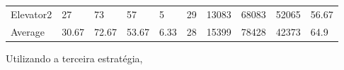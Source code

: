 \documentclass[a4paper]{article}
\begin{document}
\begin{table}[h]
\begin{tabular}{@{}llllllllll@{}}
Elevator2 & 27        & 73            & 57           & 5                                                               & 29                                                                  & 13083                                                         & 68083                                                 & 52065                                                   & 56.67         \\
Average   & 30.67     & 72.67         & 53.67        & 6.33                                                            & 28                                                               & 15399                                                         & 78428                                                 & 42373                                                   &  64.9         \\ \bottomrule
\end{tabular}
\end{table}

Utilizando a terceira estratégia,
\end{document}
